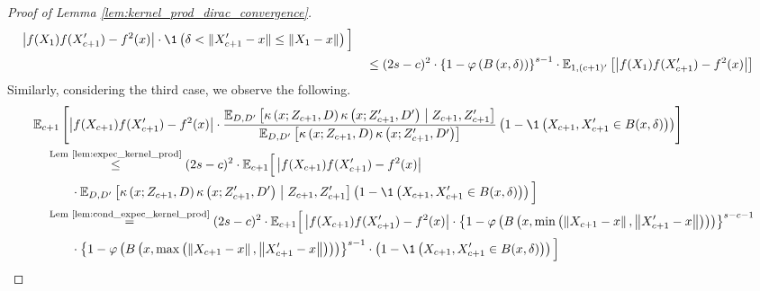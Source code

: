 \begin{proof}[Proof of Lemma \ref{lem:kernel_prod_dirac_convergence}]
\begin{equation}
\begin{aligned}
                \left| f(X_{1}) f(X_{c+1}^{\prime}) - f^{2}(x)\right| \cdot \1\left(\delta < \|X_{c+1}^{\prime} - x\| \leq \|X_{1} - x\|\right)
            \Big]\\
            & \quad \leq (2s-c)^{2} \cdot \left\{1-\varphi\left(B\left(x, \delta \right)\right)\right\}^{s-1} \cdot 
            \E_{1, (c+1)^{\prime}}\left[\left| f(X_{1}) f(X_{c+1}^{\prime}) - f^{2}(x)\right|\right]
        \end{aligned}
    \end{equation}
    Similarly, considering the third case, we observe the following.
    \begin{equation}
        \begin{aligned}
            & \E_{c+1}\left[
                \left|f(X_{c+1}) f(X_{c+1}^{\prime}) - f^{2}(x)\right|
                \cdot \frac{\E_{D, D^{\prime}}\left[\kappa\left(x; Z_{c+1}, D\right)\kappa\left(x; Z_{c+1}^{\prime}, D^{\prime}\right) \; \middle| \; Z_{c+1}, Z_{c+1}^{\prime}\right]}{\E_{D, D^{\prime}}\left[\kappa\left(x; Z_{c+1}, D\right)\kappa\left(x; Z_{c+1}^{\prime}, D^{\prime}\right)\right]} 
                \left(1 - \1\left(X_{c+1}, X_{c+1}^{\prime} \in B(x, \delta)\right)\right)
            \right]\\
            & \quad \overset{\text{Lem \ref{lem:expec_kernel_prod}}}{\leq} 
                (2s-c)^{2} \cdot\E_{c+1}\Big[
                \left|f(X_{c+1}) f(X_{c+1}^{\prime}) - f^{2}(x)\right|\\
                & \quad \quad \quad \cdot \E_{D, D^{\prime}}\left[\kappa\left(x; Z_{c+1}, D\right)\kappa\left(x; Z_{c+1}^{\prime}, D^{\prime}\right) \; \middle| \; Z_{c+1}, Z_{c+1}^{\prime}\right]
                \left(1 - \1\left(X_{c+1}, X_{c+1}^{\prime} \in B(x, \delta)\right)\right)
            \Big]\\
            & \quad \overset{\text{Lem \ref{lem:cond_expec_kernel_prod}}}{=} 
                (2s-c)^{2} \cdot
                \E_{c+1}\Big[\left|f(X_{c+1}) f(X_{c+1}^{\prime}) - f^{2}(x)\right|
                \cdot \left\{1-\varphi\left(B\left(x, \min\left(\left\|X_{c+1} - x\right\|, \left\|X_{c+1}^{\prime}-x\right\|\right)\right)\right)\right\}^{s-c-1} \\
                & \quad \quad \quad \cdot \left\{1-\varphi\left(B\left(x,\max\left(\left\|X_{c+1} - x\right\|, \left\|X_{c+1}^{\prime}-x\right\|\right)\right)\right)\right\}^{s-1}
                \cdot \left(1 - \1\left(X_{c+1}, X_{c+1}^{\prime} \in B(x, \delta)\right)\right)
            \Big]\\

\end{aligned}
\end{equation}
\end{proof}
